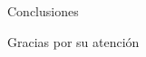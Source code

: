\documentclass[
	spanish, %
	aspectratio=43, %
	hyperref={pdfencoding=auto,psdextra},
	xcolor={dvipsnames,table,usenames}
]{beamer}
\begin{document}

\begin{frame}
	\centering
	\Huge{Conclusiones}
\end{frame}


\begin{frame}
	\centering
	\Huge{Gracias por su atención}
\end{frame}
\end{document}
